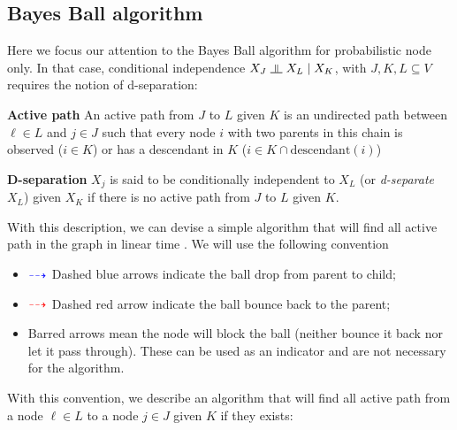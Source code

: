 \documentclass{article}
\numberwithin{equation}{section}
\newcommand{\s}{\hspace{0.1cm}}
\newcommand{\indep}{\s \rotatebox[origin=c]{90}{$\models$}\s }
\begin{document}
\subsection{Bayes Ball algorithm}
Here we focus our attention to the Bayes Ball algorithm for probabilistic node only. In that 
case, conditional independence $X_J \indep X_L \mid X_K$, with $J,K,L \subseteq V$ requires 
the notion of d-separation:
\begin{description}
        \item{\textbf{Active path}} An active path from $J$ to $L$ given $K$ is 
                an undirected path between $\ell \in L$ and $j \in J$ such that every 
                node $i$ with two parents in this chain is observed ($i \in K$) or 
                has a descendant in $K$ ($i \in K \cap \text{descendant}(i)$)
        \item{\textbf{D-separation}} $X_j$ is said to be conditionally independent to 
                $X_L$ (or 
                \textit{d-separate} $X_L$) given $X_K$ if there is no active path 
                from $J$ to $L$ given $K$.
\end{description}
With this description, we can devise a simple algorithm that will find all active 
path in the graph in linear time \cite{BB}. We will use the following convention 
\begin{itemize}
        \item $\color{blue} \dashrightarrow $ Dashed blue arrows indicate the ball drop from parent to child;
        \item $\color{red} \dashrightarrow$ Dashed red arrow indicate the ball bounce back to the 
                parent;
        \item Barred arrows mean the node will block the ball (neither bounce it back 
                nor let it pass through). These can be used as an indicator and are not 
                necessary for the algorithm.
\end{itemize}
With this convention, we describe an algorithm that will find all active path 
from a node $\ell \in L$ to a node $j \in J$ given 
$K$ if they exists:
\end{document}
